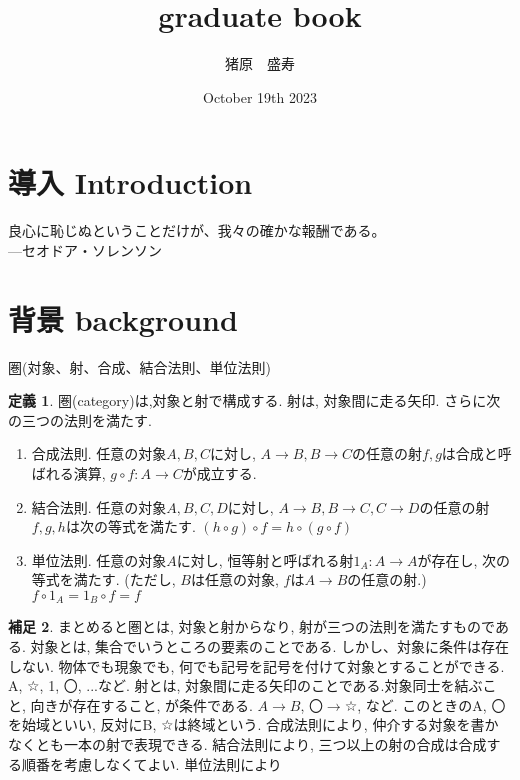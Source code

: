 \documentclass{article}
\title{graduate book}
\author{猪原　盛寿}
\date{October 19th 2023}
\theoremstyle{definition}
\newtheorem{dfn}{定義}[section]
\newtheorem{hsk}[dfn]{補足}
\begin{document}
\Large
\maketitle

\section{導入 Introduction}
良心に恥じぬということだけが、我々の確かな報酬である。\\
---セオドア・ソレンソン
\section{背景 background}
圏(対象、射、合成、結合法則、単位法則)\\
\begin{dfn}
圏(category)は,対象と射で構成する. 射は, 対象間に走る矢印. さらに次の三つの法則を満たす.
\begin{enumerate}[(1)]
    \item 合成法則. 任意の対象$A, B, C$に対し, $A\rightarrow B, B\rightarrow C$の任意の射$f, g$は合成と呼ばれる演算, $g \circ f: A\rightarrow C$が成立する.
    \item 結合法則. 任意の対象$A, B, C, D$に対し, $A\rightarrow B, B\rightarrow C, C\rightarrow D$の任意の射$f, g, h$は次の等式を満たす. $(h \circ g) \circ f = h \circ (g \circ f)$  
    \item 単位法則. 任意の対象$A$に対し, 恒等射と呼ばれる射$1_A:A\rightarrow A$が存在し, 次の等式を満たす. (ただし, $B$は任意の対象, $f$は$A\rightarrow B$の任意の射.) $f\circ 1_A = 1_B\circ f = f$  
\end{enumerate}
\end{dfn}
\begin{hsk}
まとめると圏とは, 対象と射からなり, 射が三つの法則を満たすものである.
対象とは, 集合でいうところの要素のことである. しかし、対象に条件は存在しない. 物体でも現象でも, 何でも記号を記号を付けて対象とすることができる. A, ☆, 1, 〇, ...など. 
射とは, 対象間に走る矢印のことである.対象同士を結ぶこと, 向きが存在すること, が条件である. $A \rightarrow B$, 〇$\rightarrow$☆, など. このときのA, 〇を始域といい, 反対にB, ☆は終域という.
合成法則により, 仲介する対象を書かなくとも一本の射で表現できる. 結合法則により, 三つ以上の射の合成は合成する順番を考慮しなくてよい. 単位法則により\\
\end{hsk}
\end{document}
